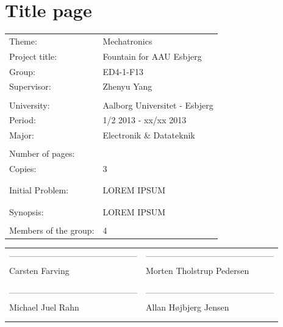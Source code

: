 \section*{Title page}
\setcounter{page}{1}
\begin{tabularx}{\hsize}{lX}
	Theme: & Mechatronics \\
	Project title: & Fountain for AAU Esbjerg \\
	Group: & ED4-1-F13 \\
	Supervisor: & Zhenyu Yang \\\\
	University: & Aalborg Universitet - Esbjerg\\
	Period: & 1/2 2013 - xx/xx 2013 \\
	Major: & Electronik \& Datateknik \\\\
	Number of pages: & \pageref{LastPage} \\ 
	Copies: & 3\\\\\\
	Initial Problem: & LOREM IPSUM\\
	& \\\cline{2-2}\\
	Synopsis: & LOREM IPSUM  \\\\
	Members of the group: & 4 \\
\end{tabularx}


\vspace{1.5cm}
\noindent\begin{tabularx}{\hsize}{XX}
--------------------------------------------- & --------------------------------------------- \\
Carsten Farving & Morten Tholstrup Pedersen \\\\\\
--------------------------------------------- & --------------------------------------------- \\
Michael Juel Rahn & Allan H{\o}jbjerg Jensen \\\\\\
\end{tabularx}

\newpage